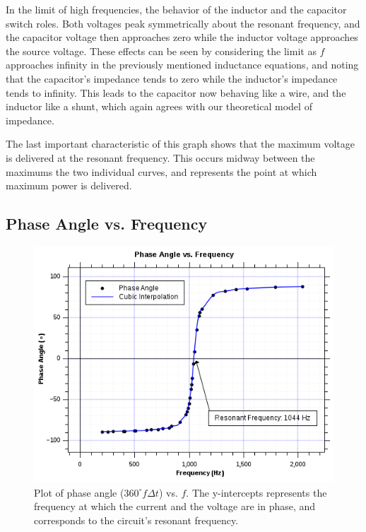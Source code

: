 \documentclass[twocolumn,english]{IEEEtran}
\theoremstyle{plain}
\theoremstyle{plain}
\begin{document}
In the limit of high frequencies, the behavior of the inductor and the capacitor switch roles. Both voltages peak symmetrically about the resonant frequency, and the capacitor voltage then approaches zero while the inductor voltage approaches the source voltage. These effects can be seen by considering the limit as $f$ approaches infinity in the previously mentioned inductance equations, and noting that the capacitor's impedance tends to zero while the inductor's impedance tends to infinity. This leads to the capacitor now behaving like a wire, and the inductor like a shunt, which again agrees with our theoretical model of impedance.

The last important characteristic of this graph shows that the maximum voltage is delivered at the resonant frequency. This occurs midway between the maximums the two individual curves, and represents the point at which maximum power is delivered.

\hrulefill

\subsection{Phase Angle vs. Frequency}

\begin{figure}[H]
	\begin{centering}
	\begin{center}
	\includegraphics[width=\linewidth]{./Part7.png}
	\caption{Plot of phase angle ($360^{\circ}f\Delta t$) vs. $f$. The y-intercepts represents the frequency at which the current and the voltage are in phase, and corresponds to the circuit's resonant frequency. }
	\label{fig:PhasevsFreq}
	\end{center}
	\par\end{centering}
\end{figure}
\end{document}
